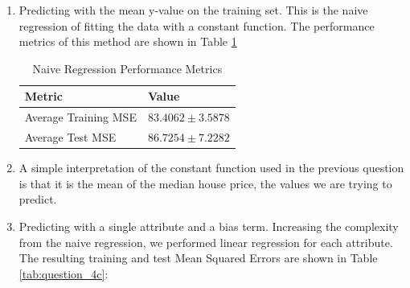 \documentclass[final,3p,times,12pt]{article}
\begin{document}
\begin{enumerate}
    \item Predicting with the mean y-value on the training set. This is the naive regression of fitting the data with a constant function. The performance metrics of this method are shown in Table \ref{tab:question_4a}
    \begin{table}[H]
        \centering
        \begin{tabular}{ll}
            \hline
            \textbf{Metric} & \textbf{Value} \\
            \hline
            Average Training MSE & $83.4062 \pm 3.5878$ \\
            Average Test MSE & $86.7254 \pm 7.2282$ \\
           \hline
        \end{tabular}
        \caption{Naive Regression Performance Metrics}
        \label{tab:question_4a}
    \end{table}

    \item A simple interpretation of the constant function used in the previous question is that it is the mean of the median house price, the values we are trying to predict. 
    
    \item Predicting with a single attribute and a bias term. Increasing the complexity from the naive regression, we performed linear regression for each attribute. The resulting training and test Mean Squared Errors are shown in Table \ref{tab:question_4c}:


\end{enumerate}
\end{document}
